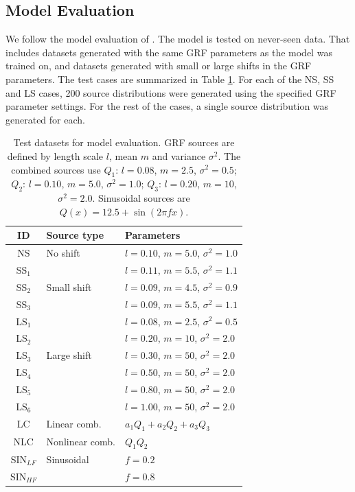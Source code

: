 \documentclass[%
 reprint,
 amsmath,amssymb,
 aps,
]{revtex4-1}
\begin{document}
\subsection{Model Evaluation}

We follow the model evaluation of \cite{sahadath2026characterization}. The model is tested on never-seen data. That includes datasets
generated with the same GRF parameters as the model was trained on, and datasets generated with small or large shifts in the GRF parameters.
The test cases are summarized in Table \ref{tab: Model evaluation}. For each of the NS, SS and LS cases, 200 source distributions were generated
using the specified GRF parameter settings. For the rest of the cases, a single source distribution was generated for each.

\begin{table}[t]
    \centering
    \caption{Test datasets for model evaluation. GRF sources are defined by
    length scale $l$, mean $m$ and variance $\sigma^2$. The combined sources use
    $Q_1$: $l{=}0.08$, $m{=}2.5$, $\sigma^2{=}0.5$;
    $Q_2$: $l{=}0.10$, $m{=}5.0$, $\sigma^2{=}1.0$;
    $Q_3$: $l{=}0.20$, $m{=}10$, $\sigma^2{=}2.0$.
    Sinusoidal sources are $Q(x) = 12.5 + \sin(2\pi f x)$.}
    \label{tab: Model evaluation}
    \small
    \setlength{\tabcolsep}{4pt}
    \begin{tabular}{|c|l|l|}
        \hline
        ID & Source type & Parameters \\
        \hline
        NS          & No shift        & $l = 0.10$, $m = 5.0$, $\sigma^2 = 1.0$ \\
        \hline
        SS$_1$      &                 & $l = 0.11$, $m = 5.5$, $\sigma^2 = 1.1$ \\
        SS$_2$      & Small shift     & $l = 0.09$, $m = 4.5$, $\sigma^2 = 0.9$ \\
        SS$_3$      &                 & $l = 0.09$, $m = 5.5$, $\sigma^2 = 1.1$ \\
        \hline
        LS$_1$      &                 & $l = 0.08$, $m = 2.5$, $\sigma^2 = 0.5$ \\
        LS$_2$      &                 & $l = 0.20$, $m = 10$,  $\sigma^2 = 2.0$ \\
        LS$_3$      & Large shift     & $l = 0.30$, $m = 50$,  $\sigma^2 = 2.0$ \\
        LS$_4$      &                 & $l = 0.50$, $m = 50$,  $\sigma^2 = 2.0$ \\
        LS$_5$      &                 & $l = 0.80$, $m = 50$,  $\sigma^2 = 2.0$ \\
        LS$_6$      &                 & $l = 1.00$, $m = 50$,  $\sigma^2 = 2.0$ \\
        \hline
        LC          & Linear comb.    & $a_1 Q_1 + a_2 Q_2 + a_3 Q_3$ \\
        NLC         & Nonlinear comb. & $Q_1 Q_2$ \\
        \hline
        SIN$_{LF}$  & Sinusoidal      & $f = 0.2$ \\
        SIN$_{HF}$  &                 & $f = 0.8$ \\
        \hline
    \end{tabular}
\end{table}
\end{document}
